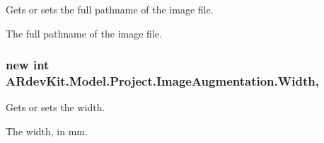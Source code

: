 Gets or sets the full pathname of the image file. 

The full pathname of the image file. \hypertarget{class_a_rdev_kit_1_1_model_1_1_project_1_1_image_augmentation_a372f087469a33d84950310dfcd52e190}{
\subsubsection[{Width}]{\setlength{\rightskip}{0pt plus 5cm}new int A\-Rdev\-Kit.\-Model.\-Project.\-Image\-Augmentation.\-Width\hspace{0.3cm}{\ttfamily [get]}, {\ttfamily [set]}}}\label{class_a_rdev_kit_1_1_model_1_1_project_1_1_image_augmentation_a372f087469a33d84950310dfcd52e190}


Gets or sets the width. 

The width, in mm. 